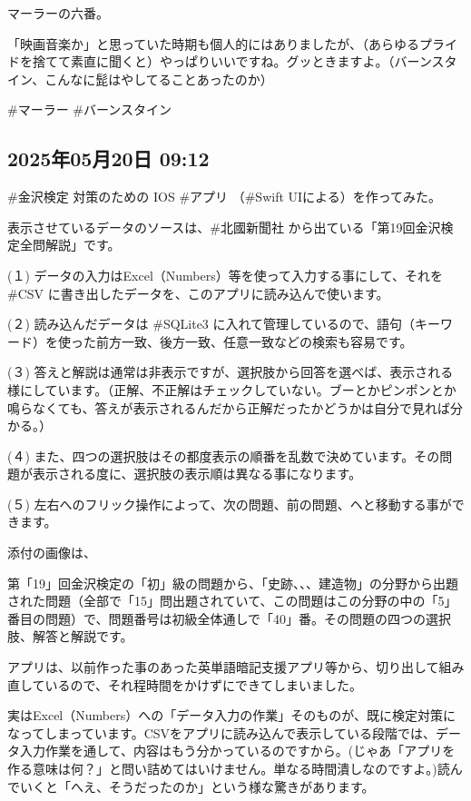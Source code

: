 \documentclass[facebook_diary.tex]{subfiles}
\begin{document}
マーラーの六番。

「映画音楽か」と思っていた時期も個人的にはありましたが、（あらゆるプライドを捨てて素直に聞くと）やっぱりいいですね。グッときますよ。（バーンスタイン、こんなに髭はやしてることあったのか）


\#マーラー \#バーンスタイン

\subsection*{2025年05月20日 09:12}

\#金沢検定 対策のための IOS \#アプリ （\#Swift UIによる）を作ってみた。

表示させているデータのソースは、\#北國新聞社 から出ている「第19回金沢検定全問解説」です。


(１) データの入力はExcel（Numbers）等を使って入力する事にして、それを \#CSV に書き出したデータを、このアプリに読み込んで使います。

(２) 読み込んだデータは \#SQLite3 に入れて管理しているので、語句（キーワード）を使った前方一致、後方一致、任意一致などの検索も容易です。

(３) 答えと解説は通常は非表示ですが、選択肢から回答を選べば、表示される様にしています。（正解、不正解はチェックしていない。ブーとかピンポンとか鳴らなくても、答えが表示されるんだから正解だったかどうかは自分で見れば分かる。）

(４) また、四つの選択肢はその都度表示の順番を乱数で決めています。その問題が表示される度に、選択肢の表示順は異なる事になります。

(５) 左右へのフリック操作によって、次の問題、前の問題、ヘと移動する事ができます。


添付の画像は、

第「19」回金沢検定の「初」級の問題から、「史跡、、、建造物」の分野から出題された問題（全部で「15」問出題されていて、この問題はこの分野の中の「5」番目の問題）で、問題番号は初級全体通しで「40」番。その問題の四つの選択肢、解答と解説です。


アプリは、以前作った事のあった英単語暗記支援アプリ等から、切り出して組み直しているので、それ程時間をかけずにできてしまいました。


実はExcel（Numbers）への「データ入力の作業」そのものが、既に検定対策になってしまっています。CSVをアプリに読み込んで表示している段階では、データ入力作業を通して、内容はもう分かっているのですから。(じゃあ「アプリを作る意味は何？」と問い詰めてはいけません。単なる時間潰しなのですよ。)読んでいくと「へえ、そうだったのか」という様な驚きがあります。
\end{document}
